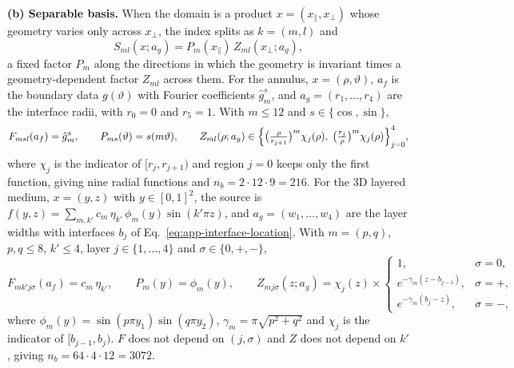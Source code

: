 \documentclass{article}
\begin{document}
\textbf{(b) Separable basis.}
When the domain is a product $x=(x_\parallel,x_\perp)$ whose geometry varies only across
$x_\perp$, the index splits as $k=(m,l)$ and
\begin{equation}
S_{ml}(x;a_g)=P_m(x_\parallel)\,Z_{ml}(x_\perp;a_g),
\label{eq:fac-separable}
\end{equation}
a fixed factor $P_m$ along the directions in which the geometry is invariant times a
geometry-dependent factor $Z_{ml}$ across them.
For the annulus, $x=(\rho,\vartheta)$, $a_f$ is the boundary data $g(\vartheta)$ with Fourier
coefficients $\hat g_m^{s}$, and $a_g=(r_1,\ldots,r_4)$ are the interface radii, with $r_0=0$ and
$r_5=1$. With $m\le 12$ and $s\in\{\cos,\sin\}$,
\begin{equation}
F_{msl}(a_f)=\hat g_m^{s},
\qquad
P_{ms}(\vartheta)=s(m\vartheta),
\qquad
Z_{ml}(\rho;a_g)\in\Bigl\{\bigl(\tfrac{\rho}{r_{j+1}}\bigr)^{m}\chi_j(\rho),\;
\bigl(\tfrac{r_j}{\rho}\bigr)^{m}\chi_j(\rho)\Bigr\}_{j=0}^{4},
\label{eq:fac-annulus}
\end{equation}
where $\chi_j$ is the indicator of $[r_j,r_{j+1})$ and region $j=0$ keeps only the first
function, giving nine radial functions and $n_b=2\cdot12\cdot9=216$.
For the 3D layered medium, $x=(y,z)$ with $y\in[0,1]^2$, the source is
$f(y,z)=\sum_{m,k'}c_m\,\eta_{k'}\,\phi_m(y)\sin(k'\pi z)$, and $a_g=(w_1,\ldots,w_4)$ are the
layer widths with interfaces $b_j$ of Eq.~\ref{eq:app-interface-location}. With
$m=(p,q)$, $p,q\le 8$, $k'\le 4$, layer $j\in\{1,\ldots,4\}$ and $\sigma\in\{0,+,-\}$,
\begin{equation}
F_{mk'j\sigma}(a_f)=c_m\,\eta_{k'},
\qquad
P_m(y)=\phi_m(y),
\qquad
Z_{mj\sigma}(z;a_g)=\chi_j(z)\times
\begin{cases}
1, & \sigma=0,\\
e^{-\gamma_m(z-b_{j-1})}, & \sigma=+,\\
e^{-\gamma_m(b_j-z)}, & \sigma=-,
\end{cases}
\label{eq:fac-layered}
\end{equation}
where $\phi_m(y)=\sin(p\pi y_1)\sin(q\pi y_2)$, $\gamma_m=\pi\sqrt{p^2+q^2}$ and $\chi_j$ is the
indicator of $[b_{j-1},b_j)$. $F$ does not depend on $(j,\sigma)$ and $Z$ does not depend on
$k'$, giving $n_b=64\cdot4\cdot12=3072$.
\end{document}
